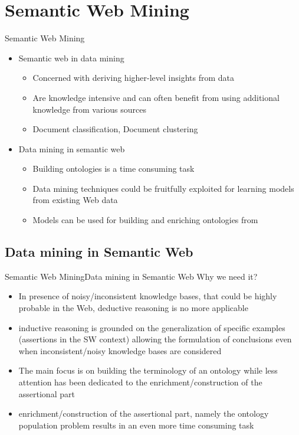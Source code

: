 \documentclass[10pt]{beamer}
\begin{document}
\section{Semantic Web Mining}

\begin{frame}{Semantic Web Mining}
\begin{itemize}
	\item Semantic web in data mining \cite{ristoski2016semantic}
	\begin{itemize}
		\item Concerned with deriving higher-level insights from data
		\item Are knowledge intensive and can often benefit from using additional knowledge from various sources
		\item Document classification, Document clustering \cite{berendt2004roadmap}
	\end{itemize}
	\item Data mining in semantic web \cite{d2010inductive}
	\begin{itemize}
		\item Building ontologies is a time consuming task
		\item Data mining techniques could be fruitfully exploited for learning models from existing Web data
		\item Models can be used for building and enriching ontologies from
	\end{itemize}
\end{itemize}
\end{frame}

\subsection{Data mining in Semantic Web}
\begin{frame}{Semantic Web Mining}{Data mining in Semantic Web}
	Why we need it? \cite{d2010inductive}
	 \begin{itemize} 
		\item In presence of noisy/inconsistent knowledge bases, that could be highly probable in  the Web, deductive reasoning is no more applicable 
		\item inductive reasoning is grounded on the generalization of specific examples (assertions in the SW context) allowing the formulation of conclusions even when inconsistent/noisy knowledge bases are considered
		\item The main focus is on   building the terminology of an ontology while less attention has been dedicated to the enrichment/construction of the assertional part
		\item enrichment/construction of the assertional part, namely the ontology population problem results in an even more time consuming task
	 \end{itemize}
\end{frame}
\end{document}
